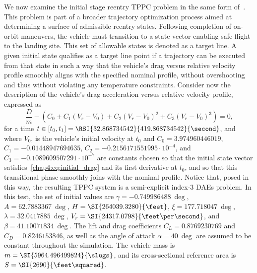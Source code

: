 We now examine the initial stage reentry \ac{TPPC} problem in the same form of~\cite{brenan1986numerical}. This problem is part of a broader trajectory optimization process aimed at determining a surface of admissible reentry states. Following completion of on-orbit maneuvers, the vehicle must transition to a state vector enabling safe flight to the landing site. This set of allowable states is denoted as a target line. A given initial state qualifies as a target line point if a trajectory can be executed from that state in such a way that the vehicle's drag versus relative velocity profile smoothly aligns with the specified nominal profile, without overshooting and thus without violating any temperature constraints. Consider now the description of the vehicle's drag acceleration versus relative velocity profile, expressed as
%
\begin{equation}
  \dfrac{D}{m} - (C_0 + C_1 (V_r - V_0) + C_2 (V_r - V_0)^2 + C_3 (V_r - V_0)^3) = 0 \text{,}
  \label{chap4:eq:initial_drag}
\end{equation}
%
for a time $t \in [t_0, t_1] = \RSI{32.868734542}{419.868734542}{\second}$, and where $V_0$, is the vehicle's initial velocity at $t_0$ and $C_0 = 3.974960446019$, $C_1 = -0.01448947694635$, $C_2 = -0.2156171551995 \cdot 10^{-4}$, and $C_3 = -0.1089609507291 \cdot 10^{-7}$ are constants chosen so that the initial state vector satisfies~\eqref{chap4:eq:initial_drag} and its first derivative at $t_0$, and so that this transitional phase smoothly joins with the nominal profile. Notice that, posed in this way, the resulting \ac{TPPC} system is a semi-explicit index-3 \acp{DAE} problem. In this test, the set of initial values are $\gamma = \SI{-0.749986488}{\deg}$, $A = \SI{62.7883367}{\deg}$, $H = \SI{264039.3280}{\feet}$, $\xi = \SI{177.718047}{\deg}$, $\lambda = \SI{32.0417885}{\deg}$, $V_r = \SI{24317.0798}{\feet\per\second}$, and $\beta = \SI{41.10071834}{\deg}$. The lift and drag coefficients $C_L = 0.8769230769$ and $C_D = 0.8246153846$, as well as the angle of attack $\alpha = \SI{40}{\deg}$ are assumed to be constant throughout the simulation. The vehicle mass is $m = \SI{5964.496499824}{\slugs}$, and its cross-sectional reference area is $S = \SI{2690}{\feet\squared}$.

